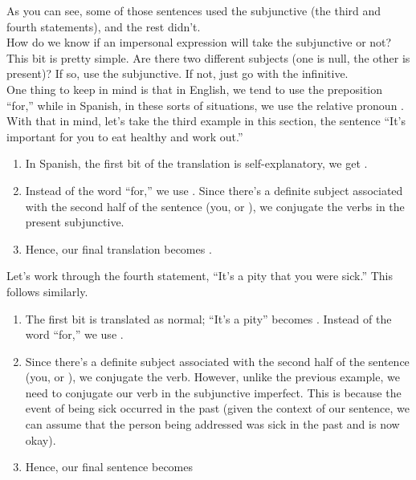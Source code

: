 As you can see, some of those sentences used the subjunctive (the third and fourth statements), and the rest didn't. \\

How do we know if an impersonal expression will take the subjunctive or not? This bit is pretty simple. Are there two different subjects (one is null, the other is present)? If so, use the subjunctive. If not, just go with the infinitive. \\

One thing to keep in mind is that in English, we tend to use the preposition ``for,'' while in Spanish, in these sorts of situations, we use the relative pronoun . \\

With that in mind, let's take the third example in this section, the sentence ``It's important for you to eat healthy and work out.''
\begin{enumerate}
	\item In Spanish, the first bit of the translation is self-explanatory, we get .
	\item Instead of the word ``for,'' we use . Since there's a definite subject associated with the second half of the sentence (you, or ), we conjugate the verbs in the present subjunctive.
	\item Hence, our final translation becomes . 
\end{enumerate}

Let's work through the fourth statement, ``It's a pity that you were sick.'' This follows similarly. 
\begin{enumerate}
	\item The first bit is translated as normal; ``It's a pity'' becomes . Instead of the word ``for,'' we use . 
	\item Since there's a definite subject associated with the second half of the sentence (you, or ), we conjugate the verb. However, unlike the previous example, we need to conjugate our verb in the subjunctive imperfect. This is because the event of being sick occurred in the past (given the context of our sentence, we can assume that the person being addressed was sick in the past and is now okay).
	\item Hence, our final sentence becomes 
\end{enumerate}

